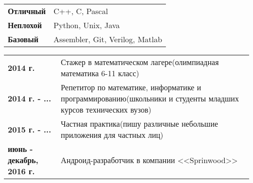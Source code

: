 \documentclass[11pt]{article}
\begin{document}

\begin{longtable} {l | p{}}
 {\textbf{Отличный}} & C++, C, Pascal \\
 {\textbf{Неплохой}} & Python, Unix, Java \\
 {\textbf{Базовый}}  & Assembler, Git, Verilog, Matlab \\
\end{longtable} 



\begin{longtable} {l | p{}}
 {\textbf{2014 г.}} & Стажер в математическом лагере(олимпиадная математика 6-11 класс) \\
 {\textbf{2014 г. - ...}} & Репетитор по математике, информатике и программированию(школьники и студенты младших курсов технических вузов) \\
 {\textbf{2015 г. - ...}} & Частная практика(пишу различные небольшие приложения для частных лиц) \\
 {\textbf{июнь - декабрь, 2016 г.}} & Андроид-разработчик в компании <<Sprinwood>>\\
\end{longtable}
 
\end{document}
